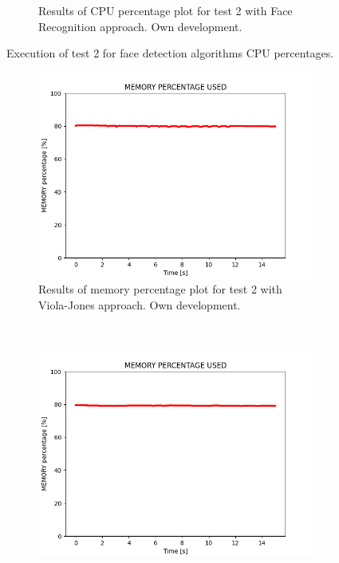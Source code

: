 \documentclass[11pt]{report} %
\begin{document}
\begin{figure}[H]
\begin{subfigure}{.5\textwidth}
		\caption{Results of CPU percentage plot for test 2 with Face Recognition approach. Own development.}
		\label{fig_computer_vision_test_2_cpu_b}
	\end{subfigure}%
	\caption{Execution of test 2 for face detection algorithms CPU percentages.}
	\label{fig_computer_vision_test_2_cpu}
\end{figure}

\begin{figure}[H]
	\centering
	\begin{subfigure}{.5\textwidth}
		\centering
		\includegraphics[width=1.0\linewidth]{assets/imgs/computer_vision/face_detection_ex_2_hc_memory.png}
		\caption{Results of memory percentage plot for test 2 with Viola-Jones approach. Own development.}
		\label{fig_computer_vision_test_2_memory_a}
	\end{subfigure}~
	\begin{subfigure}{.5\textwidth}
		\centering
		\includegraphics[width=1.0\linewidth]{assets/imgs/computer_vision/face_detection_ex_2_fr_memory.png}

\end{subfigure}
\end{figure}
\end{document}
